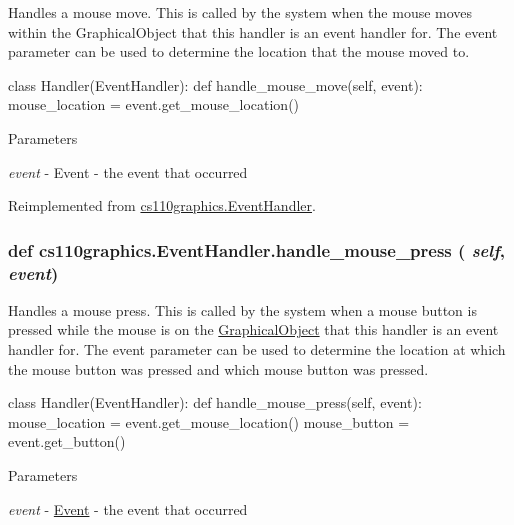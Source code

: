 Handles a mouse move. This is called by the system when the mouse moves within the GraphicalObject that this handler is an event handler for. The event parameter can be used to determine the location that the mouse moved to. 
\begin{DoxyCode}
 class Handler(EventHandler):
     def handle_mouse_move(self, event):
         mouse_location = event.get_mouse_location()
\end{DoxyCode}
 
\begin{DoxyParams}{Parameters}
\item[{\em event}]-\/ Event -\/ the event that occurred \end{DoxyParams}


Reimplemented from \hyperlink{classcs110graphics_1_1EventHandler_a521fdcd170d15c0b8baa124c78b6d1ef}{cs110graphics.EventHandler}.\hypertarget{classcs110graphics_1_1EventHandler_a547873123ebcd3fcc63a2e03d2a2fee3}{
\subsubsection[{handle\_\-mouse\_\-press}]{\setlength{\rightskip}{0pt plus 5cm}def cs110graphics.EventHandler.handle\_\-mouse\_\-press ( {\em self}, \/   {\em event})}}
\label{classcs110graphics_1_1EventHandler_a547873123ebcd3fcc63a2e03d2a2fee3}


Handles a mouse press. This is called by the system when a mouse button is pressed while the mouse is on the \hyperlink{classcs110graphics_1_1GraphicalObject}{GraphicalObject} that this handler is an event handler for. The event parameter can be used to determine the location at which the mouse button was pressed and which mouse button was pressed. 
\begin{DoxyCode}
 class Handler(EventHandler):
     def handle_mouse_press(self, event):
         mouse_location = event.get_mouse_location()
         mouse_button = event.get_button()
\end{DoxyCode}
 
\begin{DoxyParams}{Parameters}
\item[{\em event}]-\/ \hyperlink{classcs110graphics_1_1Event}{Event} -\/ the event that occurred \end{DoxyParams}


